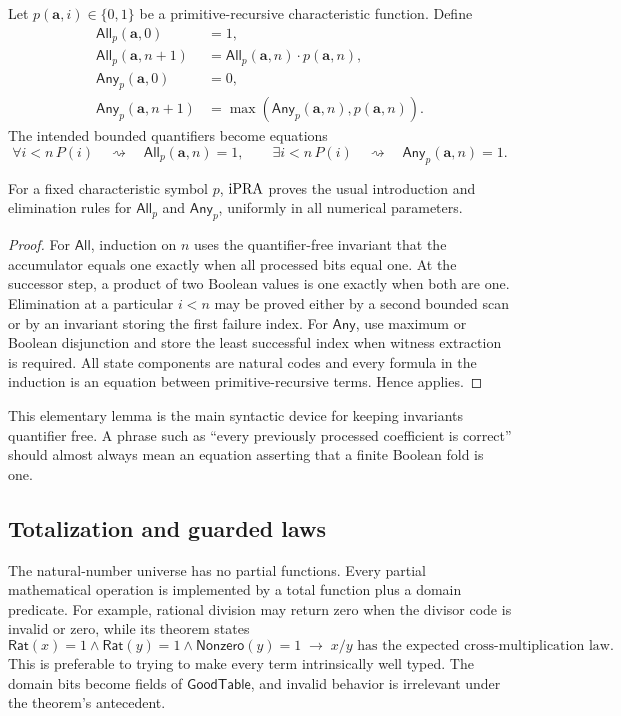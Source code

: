 Let \(p(\mathbf a,i)\in\{0,1\}\) be a primitive-recursive characteristic
function.  Define
\[
\begin{aligned}
 \mathsf{All}_p(\mathbf a,0)&=1,\\
 \mathsf{All}_p(\mathbf a,n+1)&=
   \mathsf{All}_p(\mathbf a,n)\cdot p(\mathbf a,n),\\
 \mathsf{Any}_p(\mathbf a,0)&=0,\\
 \mathsf{Any}_p(\mathbf a,n+1)&=
   \max(\mathsf{Any}_p(\mathbf a,n),p(\mathbf a,n)).
\end{aligned}
\]
The intended bounded quantifiers become equations
\[
 \forall i<n\,P(i)\quad\rightsquigarrow\quad
 \mathsf{All}_p(\mathbf a,n)=1,
 \qquad
 \exists i<n\,P(i)\quad\rightsquigarrow\quad
 \mathsf{Any}_p(\mathbf a,n)=1.
\]

\begin{lemma}
\label{lem:boolean-fold}
For a fixed characteristic symbol \(p\), \(\mathrm{iPRA}\) proves the usual
introduction and elimination rules for \(\mathsf{All}_p\) and
\(\mathsf{Any}_p\), uniformly in all numerical parameters.
\end{lemma}

\begin{proof}
For \(\mathsf{All}\), induction on \(n\) uses the quantifier-free invariant
that the accumulator equals one exactly when all processed bits equal one.
At the successor step, a product of two Boolean values is one exactly when
both are one.  Elimination at a particular \(i<n\) may be proved either by a
second bounded scan or by an invariant storing the first failure index.
For \(\mathsf{Any}\), use maximum or Boolean disjunction and store the least
successful index when witness extraction is required.  All state components
are natural codes and every formula in the induction is an equation between
primitive-recursive terms.  Hence  applies.
\end{proof}

This elementary lemma is the main syntactic device for keeping invariants
quantifier free.  A phrase such as ``every previously processed coefficient
is correct'' should almost always mean an equation asserting that a finite
Boolean fold is one.

\subsection{Totalization and guarded laws}

The natural-number universe has no partial functions.  Every partial
mathematical operation is implemented by a total function plus a domain
predicate.  For example, rational division may return zero when the divisor
code is invalid or zero, while its theorem states
\[
 \mathsf{Rat}(x)=1\wedge \mathsf{Rat}(y)=1\wedge
 \mathsf{Nonzero}(y)=1
 \;\longrightarrow\;
 x/y\text{ has the expected cross-multiplication law}.
\]
This is preferable to trying to make every term intrinsically well typed.
The domain bits become fields of \(\mathsf{GoodTable}\), and invalid behavior
is irrelevant under the theorem's antecedent.

